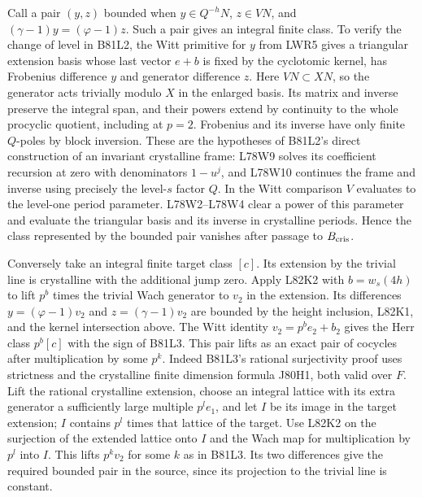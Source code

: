 Call a pair $(y,z)$ bounded when
$y\in Q^{-h}N$, $z\in VN$, and
$(\gamma-1)y=(\varphi-1)z$. Such a pair gives an integral
finite class. To verify the change of level in B81L2, the Witt
primitive for $y$ from LWR5 gives a triangular extension basis
whose last vector $e+b$ is fixed by the cyclotomic kernel,
has Frobenius difference $y$ and generator difference $z$.
Here $VN\subset XN$, so the generator acts trivially modulo $X$
in the enlarged basis. Its matrix and inverse preserve the
integral span, and their powers extend by continuity to the
whole procyclic quotient, including at $p=2$. Frobenius and
its inverse have only finite $Q$-poles by block inversion.
These are the hypotheses of B81L2's direct construction of an
invariant crystalline frame: L78W9 solves its coefficient
recursion at zero with denominators $1-u^j$, and L78W10
continues the frame and inverse using precisely the level-$s$
factor $Q$. In the Witt comparison $V$ evaluates to the level-one
period parameter. L78W2--L78W4 clear a power of this parameter
and evaluate the triangular basis and its inverse in crystalline periods. Hence the class represented by the
bounded pair vanishes after passage to $B_{\rm cris}$.

Conversely take an integral finite target class $[c]$. Its
extension by the trivial line is crystalline with the additional
jump zero. Apply L82K2 with $b=w_s(4h)$ to lift $p^b$ times
the trivial Wach generator to $v_2$ in the extension. Its
differences $y=(\varphi-1)v_2$ and $z=(\gamma-1)v_2$ are
bounded by the height inclusion, L82K1, and the kernel
intersection above. The Witt identity $v_2=p^be_2+b_2$ gives
the Herr class $p^b[c]$ with the sign of B81L3.
This pair lifts as an exact pair of cocycles after multiplication
by some $p^k$. Indeed B81L3's rational surjectivity proof uses
strictness and the crystalline finite dimension formula J80H1,
both valid over $F$. Lift the rational crystalline extension,
choose an integral lattice with its extra generator a sufficiently
large multiple $p^l e_1$, and let $I$ be its image in the target
extension; $I$ contains $p^l$ times that lattice of the target.
Use L82K2 on the surjection of the extended lattice onto $I$
and the Wach map for multiplication by $p^l$ into $I$. This
lifts $p^k v_2$ for some $k$ as in B81L3. Its two differences
give the required bounded pair in the source, since its projection
to the trivial line is constant.

